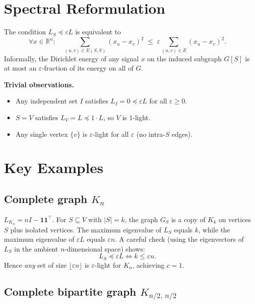 \documentclass[12pt]{article}
\theoremstyle{definition}
\theoremstyle{remark}
\begin{document}
\section{Spectral Reformulation}

The condition $L_S \preceq \varepsilon L$ is equivalent to
\[
  \forall x \in \mathbb{R}^n:\quad
  \sum_{(u,v)\in E(S,S)} (x_u - x_v)^2
  \;\le\;
  \varepsilon \sum_{(u,v)\in E} (x_u - x_v)^2.
\]
Informally, the Dirichlet energy of any signal $x$ on the induced subgraph $G[S]$ is at most an $\varepsilon$-fraction of its energy on all of $G$.

\textbf{Trivial observations.}
\begin{itemize}
  \item Any independent set $I$ satisfies $L_I = 0 \preceq \varepsilon L$ for all $\varepsilon \ge 0$.
  \item $S = V$ satisfies $L_V = L \preceq 1\cdot L$, so $V$ is $1$-light.
  \item Any single vertex $\{v\}$ is $\varepsilon$-light for all $\varepsilon$ (no intra-$S$ edges).
\end{itemize}

\section{Key Examples}

\subsection{Complete graph \texorpdfstring{$K_n$}{Kn}}

$L_{K_n} = nI - \mathbf{1}\mathbf{1}^\top$.
For $S \subseteq V$ with $|S| = k$, the graph $G_S$ is a copy of $K_k$ on vertices $S$ plus isolated vertices.  The maximum eigenvalue of $L_S$ equals $k$, while the maximum eigenvalue of $\varepsilon L$ equals $\varepsilon n$.  A careful check (using the eigenvectors of $L_S$ in the ambient $n$-dimensional space) shows:
\[
  L_S \preceq \varepsilon L \iff k \le \varepsilon n.
\]
Hence \emph{any} set of size $\lfloor\varepsilon n\rfloor$ is $\varepsilon$-light for $K_n$, achieving $c = 1$.

\subsection{Complete bipartite graph \texorpdfstring{$K_{n/2,\,n/2}$}{Knn}}
\end{document}
